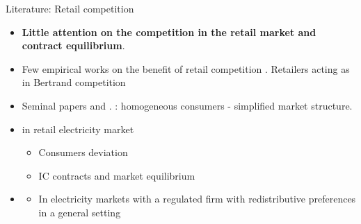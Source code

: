 \documentclass{class}
\begin{document}
\begin{frame}{Literature: Retail competition}\label{Lit_Mkt1}
    
    
\begin{itemize}
    \item \textbf{Little attention on the competition in the retail market and contract equilibrium}.  
    
    \vfill

    \item Few empirical works on the benefit of retail competition \cite{Concettini2013}. Retailers acting as in Bertrand competition \cite{von2010electricity}
    
    \vfill

   \item Seminal papers \cite{joskow2006retail} and \cite{Borenstein2003}. : homogeneous consumers - simplified market structure.

\vfill

   \item  {} in retail electricity market
   
   \begin{itemize}
       \item Consumers deviation \cite{chao2013incentive}
       \item IC contracts and market equilibrium \cite{Astier2021}
   \end{itemize}

\vfill

    \item {}
    \begin{itemize}
        \item In electricity markets with a regulated firm with redistributive preferences \cite{Martimort2020a} in a general setting \cite{Kang2023a}
    \end{itemize}




\end{itemize}

\vfill



\hyperlink{SecondCont}{}

\end{frame}
\end{document}
